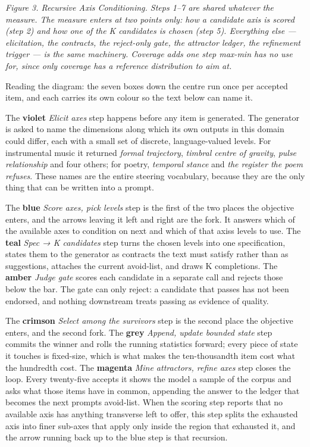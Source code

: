 \documentclass[
  10pt,
]{article}
\theoremstyle{plain}
\theoremstyle{definition}
\begin{document}
\emph{Figure 3. Recursive Axis Conditioning. Steps 1--7 are shared
whatever the measure. The measure enters at two points only: how a
candidate axis is scored (step 2) and how one of the K candidates is
chosen (step 5). Everything else --- elicitation, the contracts, the
reject-only gate, the attractor ledger, the refinement trigger --- is
the same machinery. Coverage adds one step max-min has no use for, since
only coverage has a reference distribution to aim at.}

Reading the diagram: the seven boxes down the centre run once per
accepted item, and each carries its own colour so the text below can
name it.

The \textbf{violet} \emph{Elicit axes} step happens before any item is
generated. The generator is asked to name the dimensions along which its
own outputs in this domain could differ, each with a small set of
discrete, language-valued levels. For instrumental music it returned
\emph{formal trajectory}, \emph{timbral centre of gravity}, \emph{pulse
relationship} and four others; for poetry, \emph{temporal stance} and
\emph{the register the poem refuses}. These names are the entire
steering vocabulary, because they are the only thing that can be written
into a prompt.

The \textbf{blue} \emph{Score axes, pick levels} step is the first of
the two places the objective enters, and the arrows leaving it left and
right are the fork. It answers which of the available axes to condition
on next and which of that axis\textquotesingle s levels to use. The
\textbf{teal} \emph{Spec → K candidates} step turns the chosen levels
into one specification, states them to the generator as contracts the
text must satisfy rather than as suggestions, attaches the current
avoid-list, and draws K completions. The \textbf{amber} \emph{Judge
gate} scores each candidate in a separate call and rejects those below
the bar. The gate can only reject: a candidate that passes has not been
endorsed, and nothing downstream treats passing as evidence of quality.

The \textbf{crimson} \emph{Select among the survivors} step is the
second place the objective enters, and the second fork. The
\textbf{grey} \emph{Append, update bounded state} step commits the
winner and rolls the running statistics forward; every piece of state it
touches is fixed-size, which is what makes the ten-thousandth item cost
what the hundredth cost. The \textbf{magenta} \emph{Mine attractors,
refine axes} step closes the loop. Every twenty-five accepts it shows
the model a sample of the corpus and asks what those items have in
common, appending the answer to the ledger that becomes the next
prompts\textquotesingle{} avoid-list. When the scoring step reports that
no available axis has anything transverse left to offer, this step
splits the exhausted axis into finer sub-axes that apply only inside the
region that exhausted it, and the arrow running back up to the blue step
is that recursion.
\end{document}
